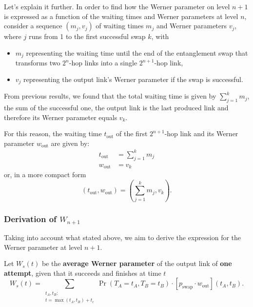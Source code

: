 \documentclass{masterthesis}
\begin{document}
Let's explain it further.
In order to find how the Werner parameter on level $n+1$ is expressed as a function of the waiting times and Werner parameters at level $n$, consider a sequence $\left(m_{j}, v_{j}\right)$ of waiting times $m_{j}$ and Werner parameters $v_{j}$, where $j$ runs from 1 to the first successful swap $k$, with
\begin{itemize}
    \item $m_{j}$ representing the waiting time until the end of the entanglement swap that transforms two $2^{n}$-hop links into a single $2^{n+1}$-hop link,
    \item $v_{j}$ representing the output link's Werner parameter if the swap is successful. 
\end{itemize}

From previous results, we found that the total waiting time is given by $\sum_{j=1}^{k} m_{j}$, the sum of the successful one, the output link is the last produced link and therefore its Werner parameter equals $v_{k}$. 

For this reason, the waiting time $t_{\text{out}}$ of the first $2^{n+1}$-hop link and its Werner parameter $w_{\text{out}}$ are given by:
\begin{align}
    t_\text{out} &= \sum_{j=1}^{k} m_{j} \\ 
    w_\text{out} &= v_k 
\end{align}
or, in a more compact form
\begin{equation}
    \left(t_\text{out}, w_\text{out}\right) = \left(\sum_{j=1}^{k} m_{j}, v_{k}\right) .
\end{equation}

\subsubsection*{Derivation of $W_{n+1}$}

Taking into account what stated above, we aim to derive the expression for the Werner parameter at level $n+1$. %

Let $W_{s}(t)$ be the \textbf{average Werner parameter} of the output link of \textbf{one attempt}, given that it succeeds and finishes at time $t$
\begin{equation}
    W_s(t) = \sum_{\substack{t_A, t_B:\\ t = \max(t_A, t_B) + t_c}} \Pr(T_A = t_A, T_B = t_B) \cdot [p_\text{swap} \cdot w_{\text{out}}](t_A, t_B) .
\end{equation}
\end{document}
